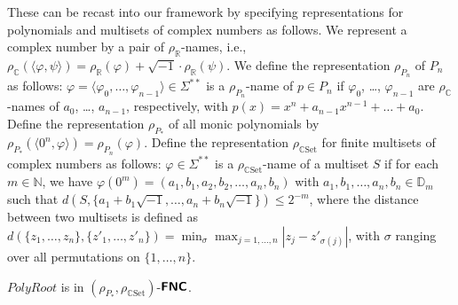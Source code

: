 \documentclass[envcountsect,envcountsame,orivec,oribibl]{llncs}
\newcommand{\R}{\mathbb R}
\newcommand{\N}{\mathbb N}
\newcommand{\C}{\mathbb C}
\newcommand{\D}{\mathbb D}
\newcommand{\classtwofont}[1]{\text{\bfseries \sffamily \upshape #1}}
\newcommand{\classFLtwo}{\classtwofont{FL}}
\newcommand{\classFNCtwo}{\classtwofont{FNC}}
\newcommand{\rhoR}{\rho _\R}
\newcommand{\rhoCSet}{\rho_{\C\mathrm{Set}}}
\newcommand{\LM}{\varSigma ^{**}}
\newcommand{\OpPolyRoot}{\mathit{PolyRoot}}
\begin{document}
These can be recast into our framework by specifying 
representations for polynomials and multisets of complex numbers as follows.
We represent a complex number by a pair of $\rhoR$-names,
i.e., $
 \rho_\C (\langle \varphi, \psi \rangle) 
= 
 \rhoR (\varphi) + \sqrt{-1} \cdot \rhoR (\psi)
$.  We define the representation $\rho_{P_n}$ of 
$P _n$ as follows: 
$\varphi = \langle \varphi _0, \ldots, \varphi _{n - 1} \rangle \in \LM$ 
is a $\rho_{P_n}$-name of $p \in P_n$ if 
$\varphi _0$, \ldots, $\varphi _{n - 1}$ are 
$\rho_{\C}$-names of $a _0$, \ldots, $a _{n - 1}$, respectively, 
with $p(x) = x^n + a_{n-1}x^{n-1} + \dots + a_0$.
Define the representation $\rho_{P_*}$ of all monic polynomials by
$\rho_{P_*}(\langle 0^n, \varphi \rangle) = \rho_{P_n}(\varphi)$.
Define the representation $\rhoCSet$ for finite multisets of complex numbers 
as follows:
$\varphi \in \LM$ is a $\rhoCSet$-name of a multiset $S$ if 
for each $m \in \N$, 
we have $\varphi(0 ^m) = ( a_1, b_1, a_2, b_2, \dots, a_n, b_n )$
with $a_1, b_1, \dots, a_n, b_n \in \D_m$
such that 
$d(S, \{a_1 + b_1 \sqrt{-1}, \dots, a_n + b_n \sqrt{-1}\}) \le 2^{-m}$, 
where the distance between two multisets is defined as $
 d (\{z_1, \dots, z_n\}, \{z'_1, \dots, z'_n\}) 
= 
 \min_{\sigma} \max_{j = 1, \ldots, n}|z_j - z'_{\sigma(j)}|
$, with $\sigma$ ranging over all permutations on $\{1, \ldots, n\}$. 


\begin{theorem}
 \label{theorem:finding-roots-is-in-NC}
 $\OpPolyRoot$ is in $(\rho_{P_*}, \rhoCSet)$-$\classFNCtwo$.
\end{theorem}

\end{document}
